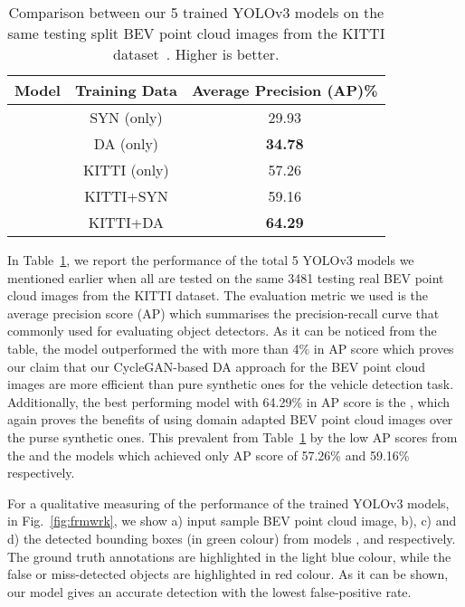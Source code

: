 \documentclass[letterpaper, 10 pt, conference]{IEEEtran}
\begin{document}
\begin{table}[t]
	\caption{Comparison between our 5 trained YOLOv3 models on the same testing split BEV point cloud images from the KITTI dataset~\cite{Geiger2012CVPR}. Higher is better.}
	\label{tab:pr}
	\centering
	\begin{tabular}{c|c|c}
		\toprule
		Model & Training Data & Average Precision (AP)\% \\
		\toprule  
		 & SYN (only) & 29.93\\
		 & DA (only) & \textbf{34.78}\\
		\midrule 
		 & KITTI (only)& 57.26\\
		& KITTI+SYN & 59.16\\
		& KITTI+DA & \textbf{64.29} \\
		\bottomrule
	\end{tabular}
\end{table}	

\smallbreak
In Table~\ref{tab:pr}, we report the performance of the total 5 YOLOv3 models we mentioned earlier when all are tested on the same 3481 testing real BEV point cloud images from the KITTI dataset. The evaluation metric we used is the average precision score (AP) which summarises the precision-recall curve that commonly used for evaluating object detectors. As it can be noticed from the table, the  model outperformed the  with more than 4\% in AP score which proves our claim that our CycleGAN-based DA approach for the BEV point cloud images are more efficient than pure synthetic ones for the vehicle detection task. Additionally, the best performing model with 64.29\% in AP score is the , which again proves the benefits of using domain adapted BEV point cloud images over the purse synthetic ones. This prevalent from Table~\ref{tab:pr} by the low AP scores from the  and the  models which achieved only AP score of 57.26\% and 59.16\% respectively. 

\smallbreak
For a qualitative measuring of the performance of the trained YOLOv3 models, in Fig.~\ref{fig:frmwrk}, we show a) input sample BEV point cloud image, b), c) and d) the detected bounding boxes (in green colour) from models ,  and  respectively. The ground truth annotations are highlighted in the light blue colour, while the false or miss-detected objects are highlighted in red colour. As it can be shown, our model  gives an accurate detection with the lowest false-positive rate.  
\end{document}

